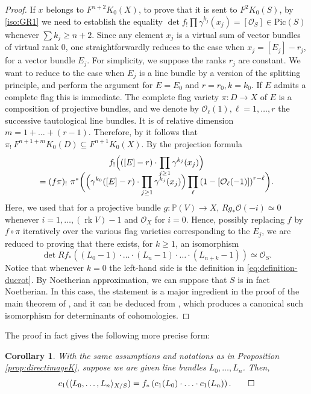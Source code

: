 \documentclass[11pt]{article}
\theoremstyle{plain}
\newtheorem{corollary}[theorem]{Corollary}
\theoremstyle{definition}
\newcommand{\PBbb}{\mathbb P}
\newcommand{\Ocal}{\mathcal O}
\newcommand{\Pic}{\mathrm{Pic}}
\DeclareMathOperator{\rk}{rk}
\begin{document}
\begin{proof}
If $x$ belongs to $F^{n+2}K_{0}(X)$, to prove that it is sent to $F^{2}K_{0}(S)$, by \eqref{iso:GR1} we need to establish the equality $\det f_!\prod \gamma^{k_j}(x_j)\!=\! [\Ocal_S] \!\in\! \Pic(S)$ whenever $\sum k_j \!\geq\! n+2$. Since any element $x_j$ is a virtual sum of vector bundles of virtual rank 0, one straightforwardly reduces to the case when $x_j = [E_j]-r_j$, for a vector bundle $E_j$. For simplicity, we suppose the ranks $r_j$ are constant. We want to reduce to the case when $E_j$ is a line bundle by a version of the splitting principle, and perform the argument for $E = E_0$ and $r=r_0, k = k_0$. If $E$ admits a complete flag this is immediate. The complete flag variety $\pi: D \to X$ of $E$ is a composition of projective bundles, and we denote by $\Ocal_\ell(1), \ell = 1, \ldots, r$ the successive tautological line bundles. It is of relative dimension $m=1+\ldots+(r-1)$. Therefore, by \cite[Exp.\,VI, Cor.\,5.8]{SGA6} it follows that $\pi_!\ F^{n+1+m} K_0(D) \subseteq F^{n+1}K_0(X)$. By the projection formula\vspace*{-3pt}
\begin{multline*}
f_! \Bigl(([E]-r) \cdot \prod_{j\geq 1} \gamma^{k_j}(x_j) \Bigr)\\[-10pt]
= ( f \pi)_!\ \pi^{\ast} \biggl(\Bigl(\gamma^{k_0}([E]-r) \cdot \prod_{j \geq 1} \gamma^{k_j}(x_j) \Bigr) \prod_\ell \left(1-[\Ocal_\ell(-1)]\right)^{r-\ell}\biggr).
\end{multline*}
Here, we used that for a projective bundle $g \colon \PBbb(V)\to X$, $Rg_\ast \Ocal(-i) \simeq 0$ whenever $i = 1, \ldots, (\rk V)-1$ and $\Ocal_X$ for $i = 0$. Hence, possibly replacing $f$ by $ f \circ \pi$ iteratively over the various flag varieties corresponding to the $E_j$, we are reduced to proving that there exists, for $k \geq 1$, an isomorphism
\begin{displaymath}
\det Rf_{\ast} \left( (L_0 -1)\cdot \ldots \cdot (L_n -1) \cdot \ldots \cdot (L_{n+k} -1)\right) \simeq \Ocal_S.
\end{displaymath}
Notice that whenever $k =0$ the left-hand side is the definition in \eqref{eq:definition-ducrot}. By Noetherian approximation, we can suppose that $S$ is in fact Noetherian. In this case, the statement is a major ingredient in the proof of the main theorem of \cite{Ducrot}, and it can be deduced from \cite[Prop.\,4.7.1]{Ducrot}, which produces a canonical such isomorphism for determinants of cohomologies.
\end{proof}
The proof in fact gives the following more precise form:
\begin{corollary}\label{cor:deligne-pairing-direct-image}
With the same assumptions and notations as in Proposition \ref{prop:directimageK}, suppose we are given line bundles $L_0, \ldots, L_n$. Then,
\begin{displaymath}
c_1(\langle L_0, \ldots, L_n \rangle_{X/S} )=f_\ast \left(c_{1}(L_0)\cdot \ldots\cdot c_{1}(L_n)\right).\qed
\end{displaymath}
\end{corollary}
\end{document}
